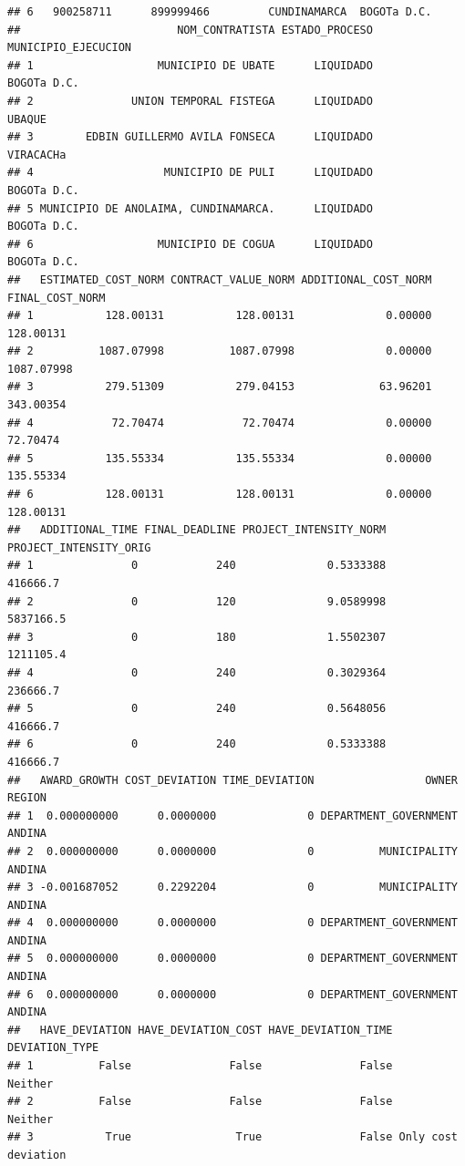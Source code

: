\documentclass[
]{article}
\begin{document}
\begin{verbatim}
## 6   900258711      899999466         CUNDINAMARCA  BOGOTa D.C.
##                        NOM_CONTRATISTA ESTADO_PROCESO MUNICIPIO_EJECUCION
## 1                   MUNICIPIO DE UBATE      LIQUIDADO         BOGOTa D.C.
## 2               UNION TEMPORAL FISTEGA      LIQUIDADO              UBAQUE
## 3        EDBIN GUILLERMO AVILA FONSECA      LIQUIDADO           VIRACACHa
## 4                    MUNICIPIO DE PULI      LIQUIDADO         BOGOTa D.C.
## 5 MUNICIPIO DE ANOLAIMA, CUNDINAMARCA.      LIQUIDADO         BOGOTa D.C.
## 6                   MUNICIPIO DE COGUA      LIQUIDADO         BOGOTa D.C.
##   ESTIMATED_COST_NORM CONTRACT_VALUE_NORM ADDITIONAL_COST_NORM FINAL_COST_NORM
## 1           128.00131           128.00131              0.00000       128.00131
## 2          1087.07998          1087.07998              0.00000      1087.07998
## 3           279.51309           279.04153             63.96201       343.00354
## 4            72.70474            72.70474              0.00000        72.70474
## 5           135.55334           135.55334              0.00000       135.55334
## 6           128.00131           128.00131              0.00000       128.00131
##   ADDITIONAL_TIME FINAL_DEADLINE PROJECT_INTENSITY_NORM PROJECT_INTENSITY_ORIG
## 1               0            240              0.5333388               416666.7
## 2               0            120              9.0589998              5837166.5
## 3               0            180              1.5502307              1211105.4
## 4               0            240              0.3029364               236666.7
## 5               0            240              0.5648056               416666.7
## 6               0            240              0.5333388               416666.7
##   AWARD_GROWTH COST_DEVIATION TIME_DEVIATION                 OWNER REGION
## 1  0.000000000      0.0000000              0 DEPARTMENT_GOVERNMENT ANDINA
## 2  0.000000000      0.0000000              0          MUNICIPALITY ANDINA
## 3 -0.001687052      0.2292204              0          MUNICIPALITY ANDINA
## 4  0.000000000      0.0000000              0 DEPARTMENT_GOVERNMENT ANDINA
## 5  0.000000000      0.0000000              0 DEPARTMENT_GOVERNMENT ANDINA
## 6  0.000000000      0.0000000              0 DEPARTMENT_GOVERNMENT ANDINA
##   HAVE_DEVIATION HAVE_DEVIATION_COST HAVE_DEVIATION_TIME      DEVIATION_TYPE
## 1          False               False               False             Neither
## 2          False               False               False             Neither
## 3           True                True               False Only cost deviation

\end{verbatim}
\end{document}

